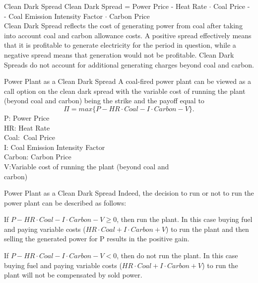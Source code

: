 {Clean Dark Spread}
Clean Dark Spread = Power Price - Heat Rate $\cdot$ Coal Price -\\- Coal Emission Intensity Factor $\cdot$ Carbon Price\\
  \vspace{0.6cm}
Clean Dark Spread reflects the cost of generating power from coal after taking into account coal and carbon allowance costs. A positive spread effectively means that it is profitable to generate electricity for the period in question, while a negative spread means that generation would not be profitable. Clean Dark Spreads do not account for additional generating charges beyond coal and carbon.

{Power Plant as a Clean Dark Spread}
A coal-fired power plant can be viewed as a call option on the clean dark spread with the variable cost of running the plant (beyond coal and carbon) being the strike and the payoff equal to\\
$$\Pi=max\{P-HR\cdot Coal - I\cdot Carbon - V\}.$$
P:\quad\;\;\;\;\; Power Price\\
HR:\quad\;\;\; Heat Rate\\
Coal:\quad\, Coal Price\\
I:\qquad\;\;\; Coal Emission Intensity Factor\\
Carbon: Carbon Price\\
V:\qquad\quad Variable cost of running the plant (beyond coal and\\
\qquad\quad\;\;\; carbon)

{Power Plant as a Clean Dark Spread}
Indeed, the decision to run or not to run the power plant can be described as follows:






	If $P-HR\cdot Coal - I\cdot Carbon - V\geq0$, then run the plant. In this case buying fuel and paying variable costs ($HR\cdot Coal + I\cdot Carbon + V$) to run the plant and then selling the generated power for P results in the positive gain.


	If $P-HR\cdot Coal - I\cdot Carbon - V<0$, then do not run the plant. In this case buying fuel and paying variable costs ($HR\cdot Coal + I\cdot Carbon + V$) to run the plant will not be compensated by sold power.






